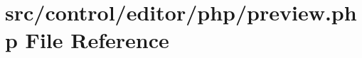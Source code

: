 \hypertarget{preview_8php}{}\section{src/control/editor/php/preview.php File Reference}
\label{preview_8php}
